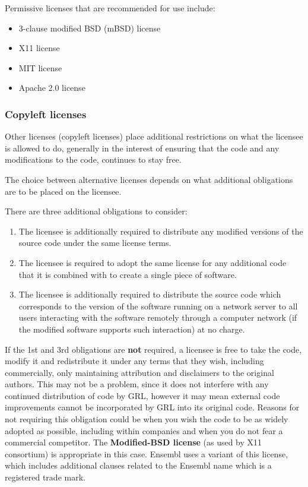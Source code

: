 \documentclass[10pt,a4paper]{article}
\begin{document}
\par Permissive licenses that are recommended for use include: 
\begin{itemize}
\item 3-clause modified BSD (mBSD) license 
\item X11 license
\item MIT license
\item Apache 2.0 license
\end{itemize}

\subsubsection{Copyleft licenses}
\par Other licenses (copyleft licenses) place additional restrictions on what the 
licensee is allowed to do, generally in the interest of ensuring that the code and 
any modifications to the code, continues to stay free. 

The choice between alternative licenses depends on 
what additional obligations are to be placed on the licensee. 

There are three additional obligations to consider: 

\begin{enumerate}
\item The licensee is additionally required to distribute any modified versions of the 
source code under the same license terms. 
\item The licensee is required to adopt the same license for any additional code that it 
is combined with to create a single piece of software. 
\item The licensee is additionally required to distribute the source code which 
corresponds to the version of the software running on a network server to all 
users interacting with the software remotely through a computer network (if the 
modified software supports such interaction) at no charge. 
\end{enumerate}

If the 1st and 3rd obligations are \textbf{not} required, a licensee is free to take the code, modify 
it and redistribute it under any terms that they wish, including commercially, only 
maintaining attribution and disclaimers to the original authors. This may not be a 
problem, since it does not interfere with any continued distribution of code by GRL, 
however it may mean external code improvements cannot be incorporated by GRL into 
its original code. Reasons for not requiring this obligation could be when you wish the 
code to be as widely adopted as possible, including within companies and when you do 
not fear a commercial competitor. The \textbf{Modified-BSD license} (as used by X11 
consortium) is appropriate in this case. Ensembl uses a variant of this license, which 
includes additional clauses related to the Ensembl name which is a registered trade 
mark. 
 
\end{document}
